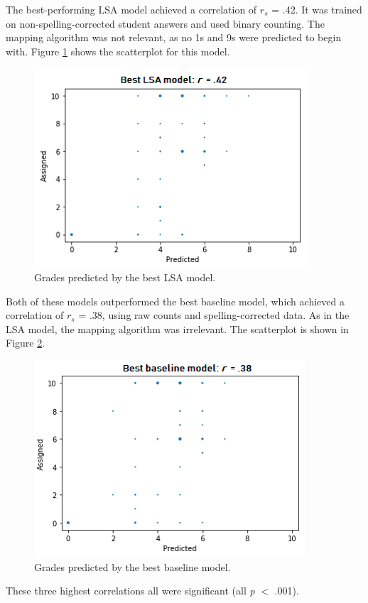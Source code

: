 \documentclass[a4paper,10pt,twoside]{article}
\begin{document}
The best-performing LSA model achieved a correlation of $\textit{r}_s$ = .42. It was trained on non-spelling-corrected student answers and used binary counting. The mapping algorithm was not relevant, as no 1s and 9s were predicted to begin with. Figure \ref{lsa} shows the scatterplot for this model.

\begin{figure}[h]
\centering
\includegraphics[width=0.5\linewidth]{"Best LSA model"}
\caption{Grades predicted by the best LSA model.}
\label{lsa}
\end{figure}

Both of these models outperformed the best baseline model, which achieved a correlation of $\textit{r}_s$ = .38, using raw counts and spelling-corrected data. As in the LSA model, the mapping algorithm was irrelevant. The scatterplot is shown in Figure \ref{baseline}.

\begin{figure}[h]
\centering
\includegraphics[width=0.5\linewidth]{"Best baseline model"}
\caption{Grades predicted by the best baseline model.}
\label{baseline}
\end{figure}

These three highest correlations all were significant (all \textit{p} $<$ .001).

\end{document}
